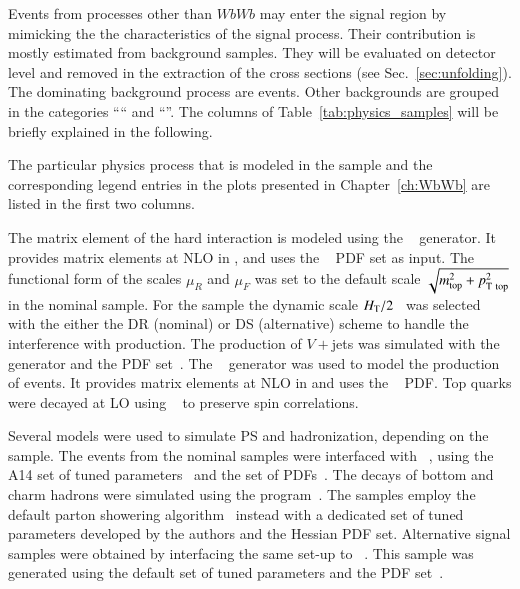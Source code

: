Events from processes other than $WbWb$ may enter the signal region 
by mimicking the the characteristics of the signal process.
Their contribution is mostly estimated from background samples.
They will be evaluated on detector level and removed in the extraction of the
cross sections (see Sec.~\ref{sec:unfolding}).
The dominating background process are \Wjets events. 
Other backgrounds are grouped in the categories ``\OtherV`` and ``\OtherT''.
The columns of Table~\ref{tab:physics_samples} will be briefly explained in the following.

The particular physics process that is modeled in the sample and the corresponding
legend entries in the plots presented in Chapter~\ref{ch:WbWb} are listed in the first two columns.

The matrix element of the hard interaction is modeled using the
\POWHEGBOX[v2]~\cite{Frixione:2007nw,Nason:2004rx,Frixione:2007vw,Alioli:2010xd}
generator. It provides matrix elements at NLO in \alphas, and uses the
\NNPDF[3.0nlo]~\cite{Ball:2014uwa} PDF set as input.
The functional form of the scales $\mu_R$ and $\mu_F$ was
set to the default scale \(\sqrt{m_{\text{top}}^{2} + p_\mathrm{T\ top}^2}\) in the nominal \ttbar sample.
For the \tW sample the dynamic scale \( H_{\text{T}} / 2 \)~\cite{ATL-PHYS-PUB-2021-042} was selected with
the either the DR (nominal) or DS (alternative) scheme to handle the interference with \ttbar production.
The production of \(V+\)jets was simulated with the \SHERPA[2.2]~\cite{Bothmann:2019yzt}
generator and the \NNPDF[3.0nnlo] PDF set~\cite{Ball:2014uwa,Carrazza:2015aoa}.
The \MGNLO[2.3.3]~\cite{Alwall:2014hca}
generator was used to model the production of \ttV events.
It provides matrix elements at NLO in  \alphas
and uses the \NNPDF[3.0nlo]~\cite{Ball:2014uwa} PDF.
Top quarks were decayed at LO using \MADSPIN~\cite{Frixione:2007zp,Artoisenet:2012st} to
preserve spin correlations. 

Several models were used to simulate PS and hadronization, depending on the sample.
The events from the nominal samples were interfaced with
\PYTHIA[8.230]~\cite{Sjostrand:2014zea}, using the A14 set of tuned
parameters~\cite{ATL-PHYS-PUB-2014-021} and the \NNPDF[2.3lo]
set of PDFs~\cite{Ball:2012cx}.
The decays of bottom and charm hadrons were simulated using the
\EVTGEN[1.6.0] program~\cite{Lange:2001uf}.
The \SHERPA samples employ the default \SHERPA parton showering algorithm~\cite{Schumann:2007mg} instead
with a dedicated set of tuned parameters developed by the
\SHERPA authors and the Hessian \NNPDF[3.0nnlo] PDF set.
Alternative signal samples were obtained by interfacing the same
\POWHEGBOX[v2] set-up to \HERWIG[7.1.3]~\cite{Bellm:2015jjp,Bahr:2008pv}.
This sample was generated using the \HERWIG[7.1]
default set of tuned parameters and the \MMHT[lo] PDF set~\cite{Harland-Lang:2014zoa}.


